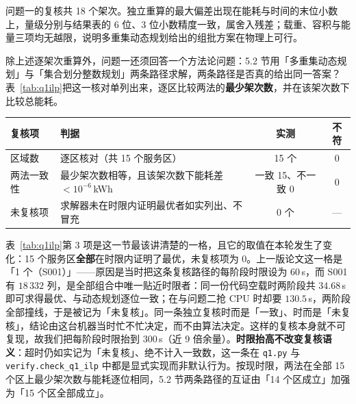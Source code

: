 问题一的复核共 18 个架次。独立重算的最大偏差出现在能耗与时间的末位小数上，量级分别与结果表的 6 位、3 位小数精度一致，属舍入残差；载重、容积与能量三项均无越限，说明多重集动态规划给出的组批方案在物理上可行。

除上述逐架次重算外，问题一还须回答一个方法论问题：5.2 节用「多重集动态规划」与「集合划分整数规划」两条路径求解，两条路径是否真的给出同一答案？表~\ref{tab:q1ilp}把这一核对单列出来，逐区比较两法的\textbf{最少架次数}，并在该架次数下比较总能耗。

\begin{center}
\begin{minipage}{\textwidth}
	\label{tab:q1ilp}
	\centering
	\begin{tabularx}{0.98\textwidth}{lXcc}
		\toprule
		复核项 & 判据 & 实测 & 不符 \\
		\midrule
		区域数 & 逐区核对（共 15 个服务区） & 15 个 & 0 \\
		两法一致性 & 最少架次数相等，且该架次数下能耗差 $<10^{-6}$\,kWh & 一致 15、不一致 0 & 0 \\
		未复核项 & 求解器未在时限内证明最优者如实列出、不冒充 & 0 个 & --- \\
		\bottomrule
	\end{tabularx}
\end{minipage}
\end{center}

表~\ref{tab:q1ilp}第 3 项是这一节最该讲清楚的一格，且它的取值在本轮发生了变化：15 个服务区\textbf{全部}在时限内证明了最优，未复核项为 0。上一版论文这一格是「1 个（S001）」——原因是当时把这条复核路径的每阶段时限设为 $60$\,s，而 S001 有 $18\,332$ 列，是全部组合中唯一贴近时限者：同一份代码空载时两阶段共 $34.68$\,s 即可求得最优、与动态规划逐位一致；在与问题二抢 CPU 时却要 $130.5$\,s，两阶段全部撞线，于是被记为「未复核」。同一条独立复核时而是「一致」、时而是「未复核」，结论由这台机器当时忙不忙决定，而不由算法决定。这样的复核本身就不可复现，故我们把每阶段时限抬到 $300$\,s（近 9 倍余量）。\textbf{时限抬高不改变复核语义}：超时仍如实记为「未复核」、绝不计入一致数，这一条在 \texttt{q1.py} 与 \texttt{verify.check\_q1\_ilp} 中都是显式实现而非默认行为。按现时限，两法在全部 15 个区上最少架次数与能耗逐位相同，5.2 节两条路径的互证由「14 个区成立」加强为「15 个区全部成立」。


